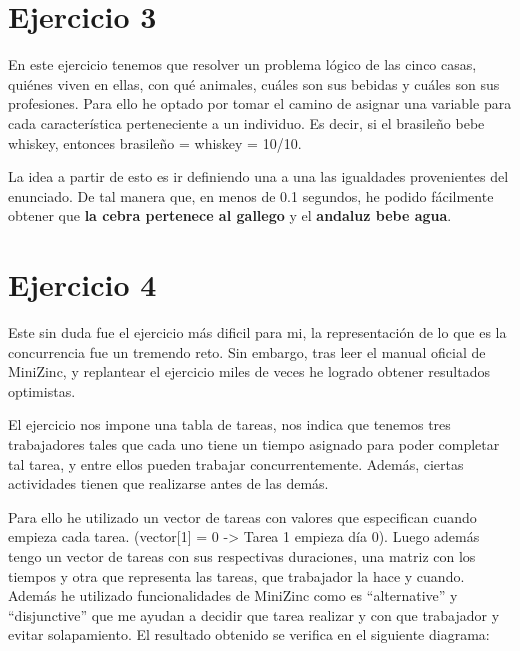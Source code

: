 \documentclass[12pt,letterpaper]{article}
\numberwithin{equation}{section} %
\numberwithin{figure}{section} %
\numberwithin{table}{section} %
\begin{document}
\section{Ejercicio 3}
En este ejercicio tenemos que resolver un problema lógico de las cinco casas,
quiénes viven en ellas, con qué animales, cuáles son sus bebidas y cuáles son
sus profesiones. Para ello he optado por tomar el camino de asignar una
variable para cada característica perteneciente a un individuo. Es decir,
si el brasileño bebe whiskey, entonces brasileño = whiskey = 10/10.
\par
La idea a partir de esto es ir definiendo una a una las igualdades provenientes
del enunciado. De tal manera que, en menos de 0.1 segundos, he podido fácilmente
obtener que \textbf{la cebra pertenece al gallego} y el \textbf{andaluz bebe agua}.

\section{Ejercicio 4}
Este sin duda fue el ejercicio más dificil para mi, la representación de lo
que es la concurrencia fue un tremendo reto. Sin embargo, tras leer el manual
oficial de MiniZinc, y replantear el ejercicio miles de veces he logrado obtener
resultados optimistas.
\par
El ejercicio nos impone una tabla de tareas, nos indica que tenemos tres trabajadores
tales que cada uno tiene un tiempo asignado para poder completar tal tarea, y
entre ellos pueden trabajar concurrentemente. Además, ciertas actividades
tienen que realizarse antes de las demás.
\par
Para ello he utilizado un vector de tareas con valores que especifican
cuando empieza cada tarea. (vector[1] = 0 -> Tarea 1 empieza día 0).
Luego además tengo un vector de tareas con sus respectivas duraciones, una matriz
con los tiempos y otra que representa las tareas, que trabajador la hace y cuando.
Además he utilizado funcionalidades de MiniZinc como es ``alternative'' y
``disjunctive'' que me ayudan a decidir que tarea realizar y con que trabajador y
evitar solapamiento. El resultado obtenido se verifica en el siguiente diagrama:
\end{document}
